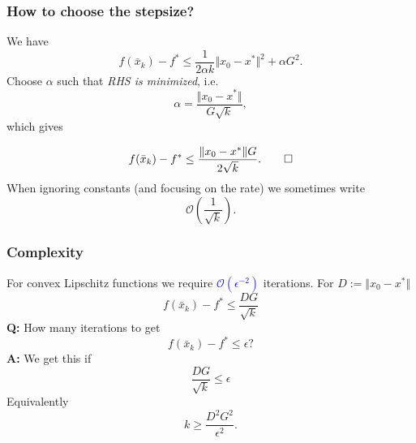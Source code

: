 \documentclass{beamer}
\begin{document}
\begin{frame}
  \frametitle{How to choose the stepsize?}
  We have
 \begin{equation}
    f(\bar{x}_k) - f^*  \le \frac{1}{2 \alpha k} \Vert x_0-x^* \Vert^2 + \alpha G^2.
  \end{equation}
  Choose $\alpha$ such that \textit{RHS is minimized}, i.e.\
  \begin{equation}
    \alpha = \frac{\Vert x_0-x^*\Vert }{G \sqrt{k}},
  \end{equation}
  which gives

  \begin{equation}
    f(\bar{x}_k) - f^* \le \frac{\Vert x_0-x^*\Vert G }{2 \sqrt{k}}. \qed
  \end{equation}
  When ignoring constants (and focusing on the rate) we sometimes write
  \begin{equation}
    \mathcal{O}\left(\frac{1}{\sqrt{k}}\right).
  \end{equation}
\end{frame}

\begin{frame}
  \frametitle{Complexity}
  For convex Lipschitz functions we require \textcolor{blue}{$\mathcal{O}(\epsilon^{-2})$} iterations. For $D:= \Vert x_0 -x^* \Vert$
  \begin{equation}
    f(\bar{x}_k) - f^* \le \frac{D G}{\sqrt{k}}
  \end{equation}
  \textbf{Q:} How many iterations to get
  \begin{equation}
    f(\bar{x}_k) - f^* \le \epsilon ?
  \end{equation}
  \textbf{A:} We get this if
  \begin{equation}
    \frac{D G}{\sqrt{k}} \le \epsilon
  \end{equation}
  Equivalently
  \begin{equation}
    k \ge \frac{D^2 G^2}{\epsilon^2}.
  \end{equation}
\end{frame}
\end{document}
